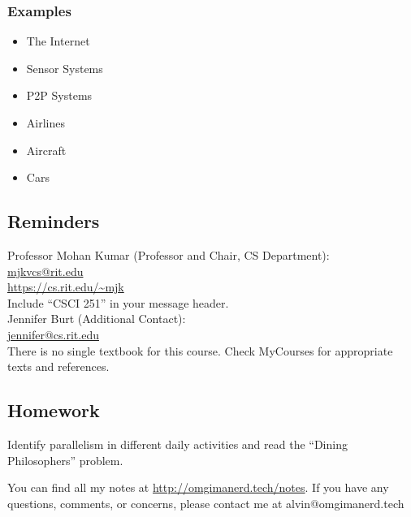 \documentclass[letterpaper, 12pt]{math}
\begin{document}
\subsubsection*{Examples}
\begin{itemize}
  \item The Internet
  \item Sensor Systems
  \item P2P Systems
  \item Airlines
  \item Aircraft
  \item Cars
\end{itemize}

\subsection*{Reminders}
Professor Mohan Kumar (Professor and Chair, CS Department): \\
\url{mjkvcs@rit.edu} \\
\url{https://cs.rit.edu/~mjk} \\
Include ``CSCI 251'' in your message header. \\

\noindent Jennifer Burt (Additional Contact): \\
\url{jennifer@cs.rit.edu} \\

There is no single textbook for this course. Check MyCourses for appropriate
texts and references.

\subsection*{Homework}
Identify parallelism in different daily activities and read the
``Dining Philosophers'' problem.

\begin{center}
  You can find all my notes at \url{http://omgimanerd.tech/notes}. If you have
  any questions, comments, or concerns, please contact me at
  alvin@omgimanerd.tech
\end{center}
\end{document}
